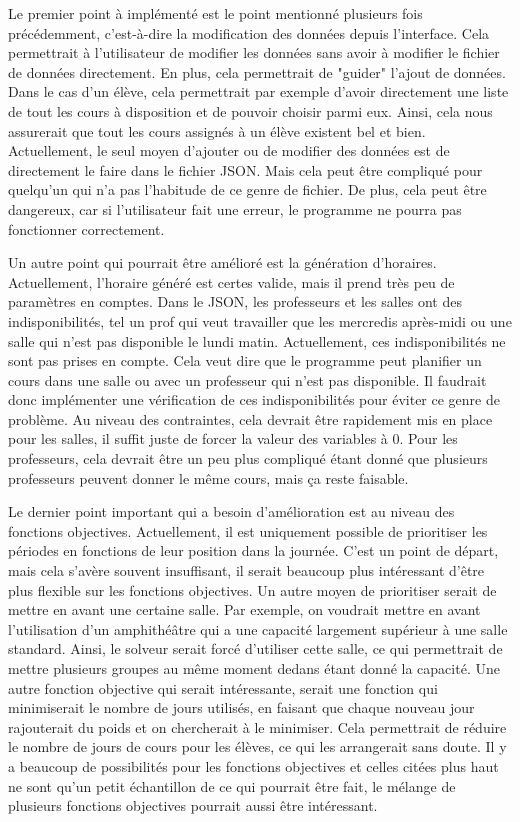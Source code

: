 Le premier point à implémenté est le point mentionné plusieurs fois précédemment, c'est-à-dire la modification des données depuis l'interface. Cela permettrait à l'utilisateur de modifier les données sans avoir à modifier le fichier de données directement. En plus, cela permettrait de "guider" l'ajout de données. Dans le cas d'un élève, cela permettrait par exemple d'avoir directement une liste de tout les cours à disposition et de pouvoir choisir parmi eux. Ainsi, cela nous assurerait que tout les cours assignés à un élève existent bel et bien. Actuellement, le seul moyen d'ajouter ou de modifier des données est de directement le faire dans le fichier JSON. Mais cela peut être compliqué pour quelqu'un qui n'a pas l'habitude de ce genre de fichier. De plus, cela peut être dangereux, car si l'utilisateur fait une erreur, le programme ne pourra pas fonctionner correctement.

Un autre point qui pourrait être amélioré est la génération d'horaires. Actuellement, l'horaire généré est certes valide, mais il prend très peu de paramètres en comptes. Dans le JSON, les professeurs et les salles ont des indisponibilités, tel un prof qui veut travailler que les mercredis après-midi ou une salle qui n'est pas disponible le lundi matin. Actuellement, ces indisponibilités ne sont pas prises en compte. Cela veut dire que le programme peut planifier un cours dans une salle ou avec un professeur qui n'est pas disponible. Il faudrait donc implémenter une vérification de ces indisponibilités pour éviter ce genre de problème. Au niveau des contraintes, cela devrait être rapidement mis en place pour les salles, il suffit juste de forcer la valeur des variables à 0. Pour les professeurs, cela devrait être un peu plus compliqué étant donné que plusieurs professeurs peuvent donner le même cours, mais ça reste faisable.

Le dernier point important qui a besoin d'amélioration est au niveau des fonctions objectives. Actuellement, il est uniquement possible de prioritiser les périodes en fonctions de leur position dans la journée. C'est un point de départ, mais cela s'avère souvent insuffisant, il serait beaucoup plus intéressant d'être plus flexible sur les fonctions objectives. Un autre moyen de prioritiser serait de mettre en avant une certaine salle. Par exemple, on voudrait mettre en avant l'utilisation d'un amphithéâtre qui a une capacité largement supérieur à une salle standard. Ainsi, le solveur serait forcé d'utiliser cette salle, ce qui permettrait de mettre plusieurs groupes au même moment dedans étant donné la capacité. Une autre fonction objective qui serait intéressante, serait une fonction qui minimiserait le nombre de jours utilisés, en faisant que chaque nouveau jour rajouterait du poids et on chercherait à le minimiser. Cela permettrait de réduire le nombre de jours de cours pour les élèves, ce qui les arrangerait sans doute. Il y a beaucoup de possibilités pour les fonctions objectives et celles citées plus haut ne sont qu'un petit échantillon de ce qui pourrait être fait, le mélange de plusieurs fonctions objectives pourrait aussi être intéressant.